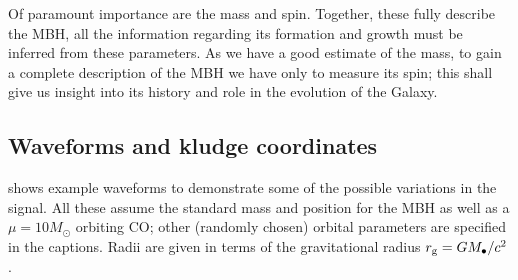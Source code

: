 Of paramount importance are the mass and spin. Together, these fully describe the MBH, all the information regarding its formation and growth must be inferred from these parameters. As we have a good estimate of the mass, to gain a complete description of the MBH we have only to measure its spin; this shall give us insight into its history and role in the evolution of the Galaxy.

\subsection{Waveforms and kludge coordinates}\label{sec:wave-ex}

 shows example waveforms to demonstrate some of the possible variations in the signal. All these assume the standard mass and position for the MBH as well as a $\mu = 10 M_\odot$ orbiting CO; other (randomly chosen) orbital parameters are specified in the captions. Radii are given in terms of the gravitational radius $r_\mathrm{g} = GM_\bullet / c^2$.
